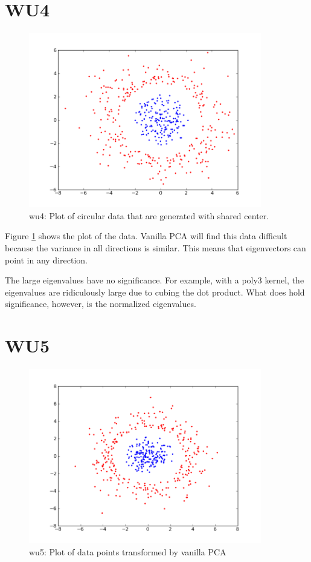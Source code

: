\section*{WU4}
\begin{figure}[here]
	\center
	\caption{wu4: Plot of circular data that are generated with shared center.}
	\label{fig:wu4}
	\includegraphics[width=4.0in]{img/wu4.png}
\end{figure}
Figure \ref{fig:wu4} shows the plot of the data. 
Vanilla PCA will find this data difficult because the variance in all directions is similar. This means that eigenvectors can point in any direction.

The large eigenvalues have no significance. For example, with a poly3 kernel, the eigenvalues are ridiculously 
large due to cubing the dot product. What does hold significance, however, is the normalized eigenvalues. 

\section*{WU5}
\begin{figure}[here]
	\center
	\caption{wu5: Plot of data points transformed by vanilla PCA}
	\label{fig:wu5}
	\includegraphics[width=4.0in]{img/wu5.png}
\end{figure}


